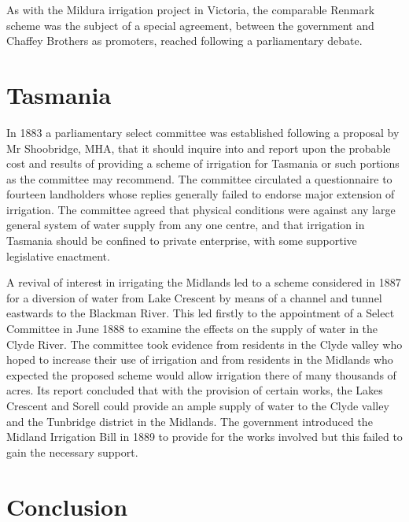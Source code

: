 As with the Mildura irrigation project in Victoria, the comparable
Renmark scheme was the subject of a special agreement, between the
government and Chaffey Brothers as promoters, reached following a
parliamentary debate.

\section*{Tasmania}

In 1883 a parliamentary select committee was established following a
proposal by Mr Shoobridge, MHA, that it should inquire into and report
upon the probable cost and results of providing a scheme of irrigation
for Tasmania or such portions as the committee may recommend.  The
committee circulated a questionnaire to fourteen landholders whose
replies generally failed to endorse major extension of irrigation.
The committee agreed that physical conditions were against any large
general system of water supply from any one centre, and that
irrigation in Tasmania should be confined to private enterprise, with
some supportive legislative enactment.

A revival of interest in irrigating the Midlands led to a scheme
considered in 1887 for a diversion of water from Lake Crescent by
means of a channel and tunnel eastwards to the Blackman River.  This
led firstly to the appointment of a Select Committee in June 1888 to
examine the effects on the supply of water in the Clyde River.  The
committee took evidence from residents in the Clyde valley who hoped
to increase their use of irrigation and from residents in the Midlands
who expected the proposed scheme would allow irrigation there of many
thousands of acres.  Its report concluded that with the provision of
certain works, the Lakes Crescent and Sorell could provide an ample
supply of water to the Clyde valley and the Tunbridge district in the
Midlands.  The government introduced the Midland Irrigation Bill in
1889 to provide for the works involved but this failed to gain the
necessary support.

\section*{Conclusion}

